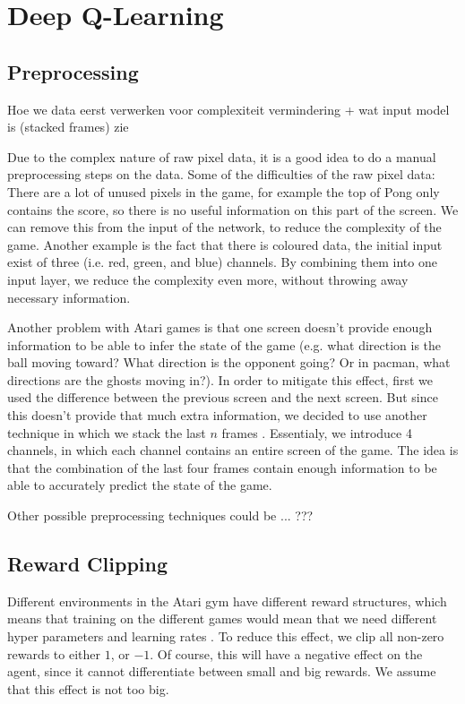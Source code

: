 \documentclass{article}
\begin{document}
\section{Deep Q-Learning}

\subsection{Preprocessing}
Hoe we data eerst verwerken voor complexiteit vermindering + wat input model is (stacked frames) zie \cite{mnih2013playing}

Due to the complex nature of raw pixel data, it is a good idea to do a manual preprocessing steps on the data. Some of the difficulties of the raw pixel data: There are a lot of unused pixels in the game, for example the top of Pong only contains the score, so there is no useful information on this part of the screen. We can remove this from the input of the network, to reduce the complexity of the game. Another example is the fact that there is coloured data, the initial input exist of three (i.e. red, green, and blue) channels. By combining them into one input layer, we reduce the complexity even more, without throwing away necessary information.

Another problem with Atari games is that one screen doesn't provide enough information to be able to infer the state of the game (e.g. what direction is the ball moving toward? What direction is the opponent going? Or in pacman, what directions are the ghosts moving in?). In order to mitigate this effect, first we used the difference between the previous screen and the next screen. But since this doesn't provide that much extra information, we decided to use another technique in which we stack the last $n$ frames \cite{mnih2013playing}. Essentialy, we introduce 4 channels, in which each channel contains an entire screen of the game. The idea is that the combination of the last four frames contain enough information to be able to accurately predict the state of the game.

Other possible preprocessing techniques could be ... ???

\subsection{Reward Clipping}

Different environments in the Atari gym have different reward structures, which means that training on the different games would mean that we need different hyper parameters and learning rates . To reduce this effect, we clip all non-zero rewards to either $1$, or $-1$. Of course, this will have a negative effect on the agent, since it cannot differentiate between small and big rewards. We assume that this effect is not too big\cite{mnih2015human}.
\end{document}
